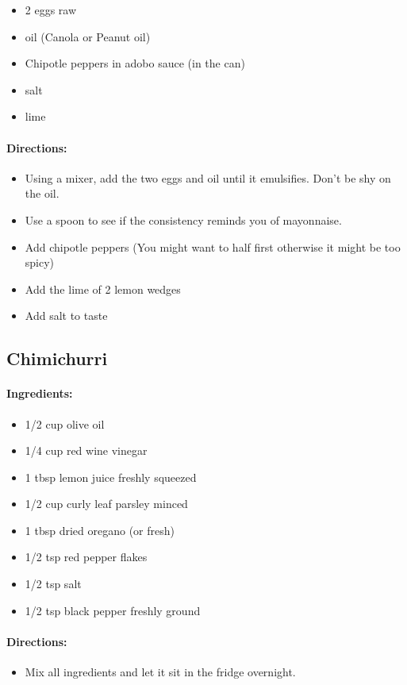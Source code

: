 \documentclass{article}
\begin{document}
\begin{itemize}
	\item 2 eggs raw
	\item oil (Canola or Peanut oil)
	\item Chipotle peppers in adobo sauce (in the can)
	\item salt
	\item lime
\end{itemize}

\paragraph{Directions:}
\begin{itemize}
	\item Using a mixer, add the two eggs and oil until it emulsifies. Don't be shy on the oil.
	\item Use a spoon to see if the consistency reminds you of mayonnaise.
	\item Add chipotle peppers (You might want to half first otherwise it might be too spicy)
	\item Add the lime of 2 lemon wedges
	\item Add salt to taste
\end{itemize}

\subsection{Chimichurri}

\paragraph{Ingredients:}
\begin{itemize}
  \item 1/2 cup olive oil
  \item 1/4 cup red wine vinegar
  \item 1 tbsp lemon juice freshly squeezed
  \item 1/2 cup curly leaf parsley minced
  \item 1 tbsp dried oregano (or fresh)
  \item 1/2 tsp red pepper flakes
  \item 1/2 tsp salt
  \item 1/2 tsp black pepper freshly ground	
\end{itemize}

\paragraph{Directions:}
\begin{itemize}
  \item Mix all ingredients and let it sit in the fridge overnight.	
\end{itemize}
\end{document}
